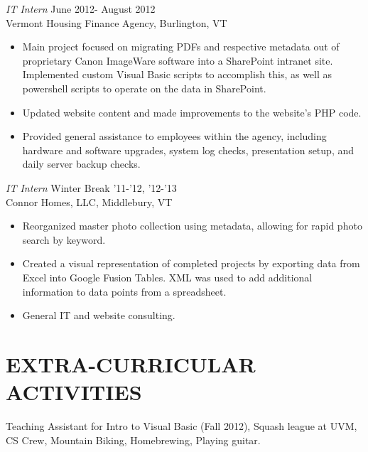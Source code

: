 \documentclass[line,margin]{res}
\begin{document}
\begin{resume}
                {\sl IT Intern} \hfill June 2012- August 2012 \\
                Vermont Housing Finance Agency, Burlington, VT
                 \begin{itemize}  \itemsep -2pt 
                 \item Main project focused on migrating PDFs and respective metadata out of proprietary Canon ImageWare software into a SharePoint intranet site. Implemented custom Visual Basic scripts to accomplish this, as well as powershell scripts to operate on the data in SharePoint.
                 \item Updated website content and made improvements to the website's PHP code.
                 \item Provided general assistance to employees within the agency, including hardware and software upgrades, system log checks, presentation setup, and daily server backup checks.
                 \end{itemize} 

	      {\sl IT Intern} \hfill Winter Break '11-'12, '12-'13 \\
	      Connor Homes, LLC, Middlebury, VT
	     \begin{itemize} \itemsep -2pt 
	      \item Reorganized master photo collection using metadata, allowing for rapid photo search by keyword.
                 \item Created a visual representation of completed projects by exporting data from Excel into Google Fusion Tables. XML 			      was used to add additional information to data points from a spreadsheet. 
                 \item General IT and website consulting.
                 \end{itemize} 
                
 
\section{EXTRA-CURRICULAR \\ ACTIVITIES}             
           Teaching Assistant for Intro to Visual Basic (Fall 2012), 
	Squash league at UVM,
            CS Crew, 
            Mountain Biking,
            Homebrewing,
            Playing guitar.
             

\end{resume}
\end{document}
